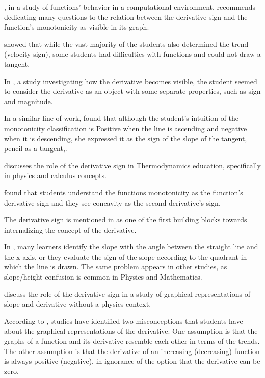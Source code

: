 \documentclass[11pt]{book}
\begin{document}
\cite{da2002analyzing}, in a study of functions' behavior in a computational environment, recommends dedicating many questions to the
relation between the derivative sign and the function's monotonicity
as visible in its graph.

\cite{hahkioniemi2004perceptual} showed that while the vast majority of the
students also determined the trend (velocity sign), some students
had difficulties with functions and could not draw a tangent.

In \cite{hahkioniemi2007derivative}, a study investigating how the derivative becomes visible, the student seemed to consider
the derivative as an object with some separate properties, such as
sign and magnitude.

In a similar line of work, \cite{hahkioniemi2008durability} found that although the student's intuition
of the monotonicity classification is \textquotedbl Positive when
the line is ascending and negative when it is descending,\textquotedbl{}
she expressed it as the \textquotedbl sign of the slope of the tangent,
pencil as a tangent,\textquotedbl{}.

\cite{christensen2010investigating} discusses the role of the derivative
sign in Thermodynamics education, specifically in physics and calculus concepts.

\cite{garcia2011characterizing} found that students understand the functions
monotonicity as the function's derivative sign and they see concavity
as the second derivative's sign.

The derivative sign is mentioned in \cite{eun2011calculus} as one
of the first building blocks towards internalizing the concept of
the derivative.

In \cite{planinic2012comparison}, many learners identify the slope with
the angle between the straight line and the x-axis, or they evaluate
the sign of the slope according to the quadrant in which the line
is drawn. The same problem appears in other studies, as slope/height
confusion is common in Physics and
Mathematics.

\cite{christensen2012investigating} discuss the role of the derivative
sign in a study of graphical representations
of slope and derivative without a physics context.

According to \cite{hempel2018noncongruence}, studies have identified
two misconceptions that students have about the graphical representations of
the derivative. One assumption is that the graphs of a function and
its derivative resemble each other in terms of the trends. The other assumption is that the derivative
of an increasing (decreasing) function is always positive (negative),
in ignorance of the option that the derivative can be zero.
\end{document}
